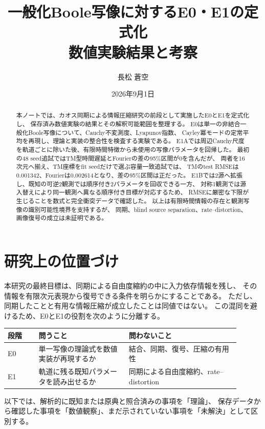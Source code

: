 \documentclass[a4paper,11pt]{jlreq}
\title{一般化Boole写像に対するE0・E1の定式化\\数値実験結果と考察}
\author{長松 蒼空}
\date{2026年9月1日}
\begin{document}
\maketitle

\begin{abstract}
本ノートでは、カオス同期による情報圧縮研究の前段として実施したE0とE1を定式化し、
保存済み数値実験の結果とその解釈可能範囲を整理する。
E0は単一の非結合一般化Boole写像について、Cauchy不変測度、Lyapunov指数、
Cayley冪モードの定常平均を再現し、理論と実装の整合性を検査する実験である。
E1Aでは周辺Cauchy尺度を軌道ごとに除いた後、有限時間特徴から未使用の写像パラメータを回帰した。
最初の48 seed追試ではTM型時間遅延とFourierの差の95\%区間が0を含んだが、
両者を16次元へ揃え、TM座標をfit seedだけで選ぶ容量一致追試では、
TMのtest RMSEは0.001342、Fourierは0.002614となり、差の95\%区間は正だった。
E1Bでは2源へ拡張し、既知の可逆2観測では順序付き2パラメータを回収できる一方、
対称1観測では源入替えにより同一観測へ異なる順序付き目標が対応するため、
RMSEに厳密な下限が生じることを数式と完全衝突データで確認した。
以上は有限時間情報の存在と観測写像の識別可能性境界を支持するが、
同期、blind source separation、rate--distortion、画像復号の成立は未証明である。
\end{abstract}

\section{研究上の位置づけ}

本研究の最終目標は、同期による自由度縮約の中に入力依存情報を残し、
その情報を有限次元表現から復号できる条件を明らかにすることである。
ただし、同期したことと有用な情報圧縮が成立したことは同値ではない。
この混同を避けるため、E0とE1の役割を次のように分離する。

\begin{center}
\begin{tabular}{p{0.12\linewidth}p{0.35\linewidth}p{0.43\linewidth}}
\toprule
段階 & 問うこと & 問わないこと \\
\midrule
E0 & 単一写像の理論式を数値実装が再現するか & 結合、同期、復号、圧縮の有用性 \\
E1 & 軌道に残る既知パラメータを読み出せるか & 同期による自由度縮約、rate--distortion \\
\bottomrule
\end{tabular}
\end{center}

以下では、解析的に既知または原典と照合済みの事項を「理論」、
保存データから確認した事項を「数値観察」、まだ示されていない事項を「未解決」として区別する。
\end{document}
